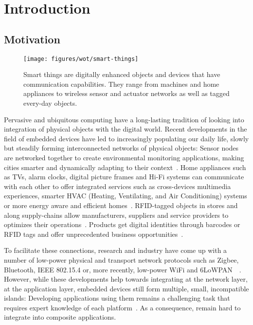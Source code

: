 \chapter{Introduction}
\minitoc

\section{Motivation}
\begin{figure}
\centering
\texttt{[image: figures/wot/smart-things]}
\caption{Smart things are digitally enhanced objects and devices that have communication capabilities. They range from machines and home appliances to wireless sensor and actuator networks as well as tagged every-day objects.}
\label{fig:smartThings}
\end{figure}
Pervasive and ubiquitous computing have a long-lasting tradition of looking into integration of physical objects with the digital world. Recent developments in the field of embedded devices have led to \newterm{\sts{}} increasingly populating our daily life, slowly but steadily forming interconnected networks of physical objects: Sensor nodes are networked together to create environmental monitoring applications, making cities smarter and dynamically adapting to their context~\cite{Vasseur2010}. Home appliances such as TVs, alarm clocks, digital picture frames and Hi-Fi systems can communicate with each other to offer integrated services such as cross-devices multimedia experiences, smarter HVAC (Heating, Ventilating, and Air Conditioning) systems or more energy aware and efficient homes~\cite{Kovatsch2010,Helal2005,Vasseur2010,Mattern2005,Mattern2010a}. RFID-tagged objects in stores and along supply-chains allow manufacturers, suppliers and service providers to optimizes their operations~\cite{Bolic2010,Floerkemeier2010}. Products get digital identities through barcodes or RFID tags and offer unprecedented business opportunities~\cite{Floerkemeier2007,Floerkemeier2007a,Bolic2010,Mattern2005}. 

To facilitate these connections, research and industry have come up with a number of low-power physical and transport network protocols such as Zigbee, Bluetooth, IEEE 802.15.4 or, more recently, low-power WiFi and 6LoWPAN~\cite{Hui2008a,Hui2008}~. However, while these developments help towards integrating \sts{} at the network layer, at the application layer, embedded devices still form multiple, small, incompatible islands: Developing applications using them remains a challenging task that requires expert knowledge of each \sts{} platform~\cite{DeSouza2008,Riedel2010}. As a consequence, \sts{} remain hard to integrate into composite applications. 

